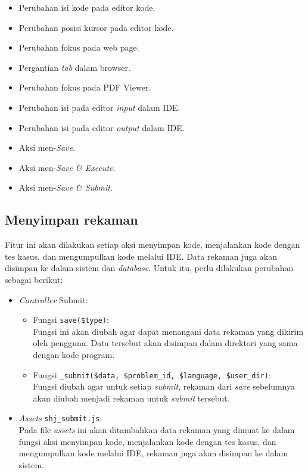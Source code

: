 \begin{itemize}
    \item Perubahan isi kode pada editor kode.
    \item Perubahan posisi kursor pada editor kode.
    \item Perubahan fokus pada web page.
    \item Pergantian \textit{tab} dalam browser.
    \item Perubahan fokus pada PDF Viewer.
    \item Perubahan isi pada editor \textit{input} dalam IDE.
    \item Perubahan isi pada editor \textit{output} dalam IDE.
    \item Aksi men-\textit{Save}.
    \item Aksi men-\textit{Save \& Execute}.
    \item Aksi men-\textit{Save \& Submit}.
\end{itemize}

\subsection{Menyimpan rekaman}
\label{sub:4:3:menyimpanrekaman}

Fitur ini akan dilakukan setiap aksi menyimpan kode, menjalankan kode dengan tes kasus, dan mengumpulkan kode melalui IDE. Data rekaman juga akan disimpan ke dalam sistem dan \textit{database}. Untuk itu, perlu dilakukan perubahan sebagai berikut:

\begin{itemize}
    \item \textit{Controller} Submit:
          \begin{itemize}
              \item Fungsi \verb|save($type)|: \\
                    Fungsi ini akan diubah agar dapat menangani data rekaman yang dikirim oleh pengguna. Data tersebut akan disimpan dalam direktori yang sama dengan kode program.
              \item Fungsi \verb|_submit($data, $problem_id, $language, $user_dir)|: \\
                    Fungsi diubah agar untuk setiap \textit{submit}, rekaman dari \textit{save} sebelumnya akan diubah menjadi rekaman untuk \textit{submit} tersebut.
          \end{itemize}
    \item \textit{Assets} \verb|shj_submit.js|: \\
          Pada file \textit{assets} ini akan ditambahkan data rekaman yang dimuat ke dalam fungsi aksi menyimpan kode, menjalankan kode dengan tes kasus, dan mengumpulkan kode melalui IDE, rekaman juga akan disimpan ke dalam sistem.
\end{itemize}

